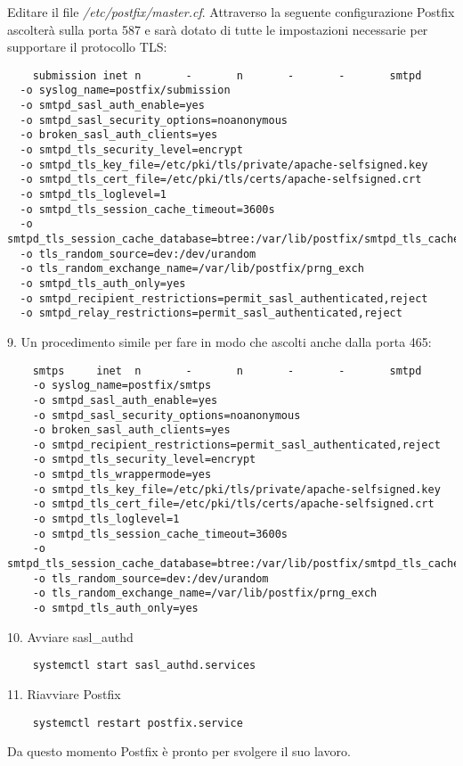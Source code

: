 Editare il file \textit{/etc/postfix/master.cf}. Attraverso la seguente configurazione Postfix ascolterà 
sulla porta 587 e sarà dotato di tutte le impostazioni necessarie per supportare il protocollo TLS:

\begin{verbatim}
    submission inet n       -       n       -       -       smtpd
  -o syslog_name=postfix/submission
  -o smtpd_sasl_auth_enable=yes
  -o smtpd_sasl_security_options=noanonymous
  -o broken_sasl_auth_clients=yes
  -o smtpd_tls_security_level=encrypt
  -o smtpd_tls_key_file=/etc/pki/tls/private/apache-selfsigned.key
  -o smtpd_tls_cert_file=/etc/pki/tls/certs/apache-selfsigned.crt
  -o smtpd_tls_loglevel=1
  -o smtpd_tls_session_cache_timeout=3600s
  -o smtpd_tls_session_cache_database=btree:/var/lib/postfix/smtpd_tls_cache
  -o tls_random_source=dev:/dev/urandom
  -o tls_random_exchange_name=/var/lib/postfix/prng_exch
  -o smtpd_tls_auth_only=yes
  -o smtpd_recipient_restrictions=permit_sasl_authenticated,reject
  -o smtpd_relay_restrictions=permit_sasl_authenticated,reject
\end{verbatim}
9. Un procedimento simile per fare in modo che ascolti anche dalla porta 465:

\begin{verbatim}
    smtps     inet  n       -       n       -       -       smtpd
    -o syslog_name=postfix/smtps
    -o smtpd_sasl_auth_enable=yes
    -o smtpd_sasl_security_options=noanonymous
    -o broken_sasl_auth_clients=yes
    -o smtpd_recipient_restrictions=permit_sasl_authenticated,reject
    -o smtpd_tls_security_level=encrypt
    -o smtpd_tls_wrappermode=yes
    -o smtpd_tls_key_file=/etc/pki/tls/private/apache-selfsigned.key
    -o smtpd_tls_cert_file=/etc/pki/tls/certs/apache-selfsigned.crt
    -o smtpd_tls_loglevel=1
    -o smtpd_tls_session_cache_timeout=3600s
    -o smtpd_tls_session_cache_database=btree:/var/lib/postfix/smtpd_tls_cache
    -o tls_random_source=dev:/dev/urandom
    -o tls_random_exchange_name=/var/lib/postfix/prng_exch
    -o smtpd_tls_auth_only=yes
\end{verbatim}
10. Avviare sasl\_authd
\begin{verbatim}
    systemctl start sasl_authd.services
\end{verbatim}
11. Riavviare Postfix
\begin{verbatim}
    systemctl restart postfix.service
\end{verbatim}

Da questo momento Postfix è pronto per svolgere il suo lavoro.

